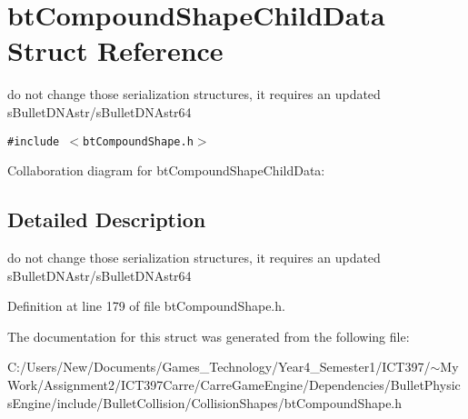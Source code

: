 \hypertarget{structbt_compound_shape_child_data}{
\section{btCompoundShapeChildData Struct Reference}
\label{structbt_compound_shape_child_data}
}
do not change those serialization structures, it requires an updated sBulletDNAstr/sBulletDNAstr64  


{\tt \#include $<$btCompoundShape.h$>$}

Collaboration diagram for btCompoundShapeChildData:

\subsection{Detailed Description}
do not change those serialization structures, it requires an updated sBulletDNAstr/sBulletDNAstr64 

Definition at line 179 of file btCompoundShape.h.

The documentation for this struct was generated from the following file:\begin{CompactItemize}
\item 
C:/Users/New/Documents/Games\_\-Technology/Year4\_\-Semester1/ICT397/$\sim$My Work/Assignment2/ICT397Carre/CarreGameEngine/Dependencies/BulletPhysicsEngine/include/BulletCollision/CollisionShapes/btCompoundShape.h\end{CompactItemize}
